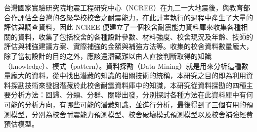 
台灣國家實驗研究院地震工程研究中心（NCREE）在九二一大地震後，與教育部合作評估全台灣的各級學校校舍之耐震能力，在此計畫執行的過程中產生了大量的評估與調查資料，因此 NCREE 便建立了一個校舍耐震能力資料庫來收集各種相關的資料，收集了包括校舍的各種設計參數、材料強度、校舍現況及年齡、技師的評估與補強建議方案、實際補強的金額與補強方法等。收集的校舍資料數量龐大，除了當初設計的目的之外，應該還潛藏難以由人直接判斷取得的知識（knowledge）、模式（pattern）。資料探勘（Data Mining）就是用來分析這種數量龐大的資料，從中找出潛藏的知識的相關技術的統稱，本研究之目的即為利用資料探勘技術來發掘潛藏於此校舍耐震資料庫中的知識，本研究從資料探勘的四種主要分析方法：回歸、分類、分群、關聯出發，分別探討各種方法在此資料庫中有何可能的分析方向，有哪些可能的潛藏知識，並進行分析，最後得到了三個有用的預測模型，分別為校舍耐震能力預測模型、校舍破壞模式預測模型以及校舍補強經費預估模型。
	